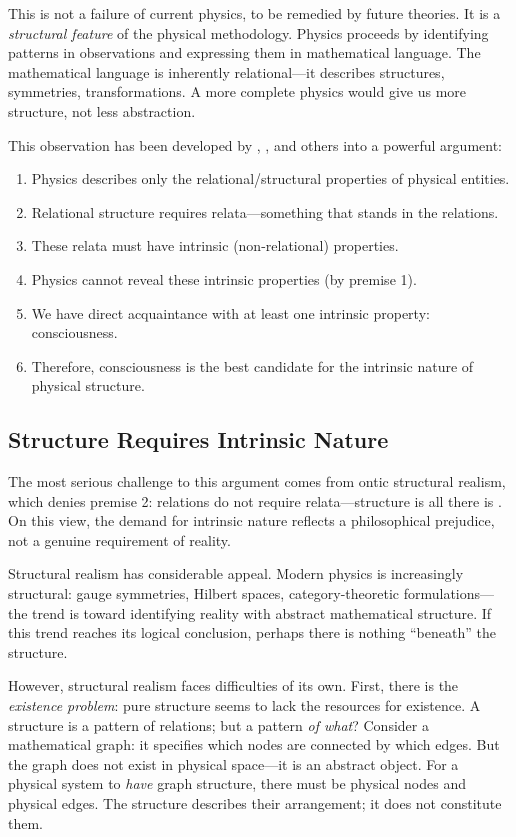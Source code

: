 \documentclass[11pt,a4paper]{article}
\theoremstyle{definition}
\theoremstyle{plain}
\theoremstyle{remark}
\begin{document}
This is not a failure of current physics, to be remedied by future theories. It is a \textit{structural feature} of the physical methodology. Physics proceeds by identifying patterns in observations and expressing them in mathematical language. The mathematical language is inherently relational---it describes structures, symmetries, transformations. A more complete physics would give us more structure, not less abstraction.

This observation has been developed by \citet{Strawson2006}, \citet{Goff2017}, and others into a powerful argument:

\begin{enumerate}
    \item Physics describes only the relational/structural properties of physical entities.
    \item Relational structure requires relata---something that stands in the relations.
    \item These relata must have intrinsic (non-relational) properties.
    \item Physics cannot reveal these intrinsic properties (by premise 1).
    \item We have direct acquaintance with at least one intrinsic property: consciousness.
    \item Therefore, consciousness is the best candidate for the intrinsic nature of physical structure.
\end{enumerate}

\subsection{Structure Requires Intrinsic Nature}\label{sec:requires}

The most serious challenge to this argument comes from ontic structural realism, which denies premise 2: relations do not require relata---structure is all there is \citep{Ladyman2007}. On this view, the demand for intrinsic nature reflects a philosophical prejudice, not a genuine requirement of reality.

Structural realism has considerable appeal. Modern physics is increasingly structural: gauge symmetries, Hilbert spaces, category-theoretic formulations---the trend is toward identifying reality with abstract mathematical structure. If this trend reaches its logical conclusion, perhaps there is nothing ``beneath'' the structure.

However, structural realism faces difficulties of its own. First, there is the \textit{existence problem}: pure structure seems to lack the resources for existence. A structure is a pattern of relations; but a pattern \textit{of what}? Consider a mathematical graph: it specifies which nodes are connected by which edges. But the graph does not exist in physical space---it is an abstract object. For a physical system to \textit{have} graph structure, there must be physical nodes and physical edges. The structure describes their arrangement; it does not constitute them.
\end{document}
